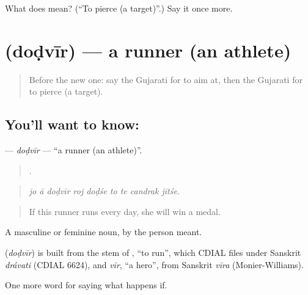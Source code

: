 \begin{tcolorbox}[breakable,colback=teal!4,colframe=teal!35!black,title={Before you move on}]
What does  mean? (\textquotedblleft{}To pierce (a target)\textquotedblright{}.) Say it once more.
\end{tcolorbox}
\section[\texorpdfstring{\gu{દોડવીર} (doḍvīr)}{દોડવીર (doḍvīr)}]{ (doḍvīr) — a runner (an athlete)}

\label{lesson:GU-C550-dodvir}



\begin{quote}
Before the new one: say the Gujarati for to aim at, then the Gujarati for to pierce (a target).
\end{quote}

\subsection*{You'll want to know: }
\textbf{} — \emph{doḍvīr} — \textquotedblleft{}a runner (an athlete)\textquotedblright{}.

\begin{quote}
        .
\end{quote}

\begin{quote}
\emph{jo ā doḍvīr roj doḍśe to te candrak jītśe.}
\end{quote}

\begin{quote}
If this runner runs every day, she will win a medal.
\end{quote}

A masculine or feminine noun, by the person meant.

\begin{cousinweb}
\textbf{} (\emph{doḍvīr}) is built from the stem of \textbf{}, \textquotedblleft{}to run\textquotedblright{}, which CDIAL files under Sanskrit \emph{drávati} (CDIAL 6624), and \emph{vīr}, \textquotedblleft{}a hero\textquotedblright{}, from Sanskrit \emph{vīra} (Monier-Williams).
\end{cousinweb}

\begin{grammarlens}[title={What you've built}]
One more word for saying what happens if.
\end{grammarlens}


